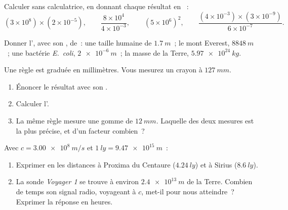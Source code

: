 \begin{exercise}[$\star$]\label{exo:g10:orders-of-magnitude:3}
Calculer sans calculatrice, en donnant chaque résultat en ~:
\[
(3\times10^{8})\times(2\times10^{-5}), \qquad
\frac{8\times10^{4}}{4\times10^{-3}}, \qquad
(5\times10^{6})^{2}, \qquad
\frac{(4\times10^{-3})\times(3\times10^{-9})}{6\times10^{-7}} .
\]
\end{exercise}

\begin{exercise}[$\star$]\label{exo:g10:orders-of-magnitude:4}
Donner l', avec son , de~: une taille
humaine de $\qty{1.7}{m}$~; le mont Everest, $\qty{8848}{m}$~; une
bactérie \emph{E.~coli}, $\qty{2e-6}{m}$~; la masse de la Terre,
$\qty{5.97e24}{kg}$.
\end{exercise}

\begin{exercise}[$\star$]\label{exo:g10:orders-of-magnitude:5}
Une règle est graduée en millimètres. Vous mesurez un crayon à
$\qty{127}{mm}$.
\begin{enumerate}
  \item Énoncer le résultat avec son .
  \item Calculer l'.
  \item La même règle mesure une gomme de $\qty{12}{mm}$. Laquelle des
        deux mesures est la plus précise, et d'un facteur combien~?
\end{enumerate}
\end{exercise}

\begin{exercise}[$\star\star$]\label{exo:g10:orders-of-magnitude:6}
Avec $c = \qty{3.00e8}{m/s}$ et $\qty{1}{ly} = \qty{9.47e15}{m}$~:
\begin{enumerate}
  \item Exprimer en  les distances à Proxima du Centaure
        ($\qty{4.24}{ly}$) et à Sirius ($\qty{8.6}{ly}$).
  \item La sonde \emph{Voyager 1} se trouve à environ
        $\qty{2.4e13}{m}$ de la Terre. Combien de temps son signal
        radio, voyageant à $c$, met-il pour nous atteindre~? Exprimer
        la réponse en heures.
\end{enumerate}
\end{exercise}

